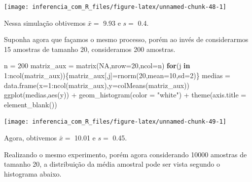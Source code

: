 \documentclass[
]{book}
\newenvironment{Shaded}{\begin{snugshade}}{\end{snugshade}}
\newcommand{\AttributeTok}[1]{\textcolor[rgb]{0.77,0.63,0.00}{#1}}
\newcommand{\ConstantTok}[1]{\textcolor[rgb]{0.00,0.00,0.00}{#1}}
\newcommand{\ControlFlowTok}[1]{\textcolor[rgb]{0.13,0.29,0.53}{\textbf{#1}}}
\newcommand{\DecValTok}[1]{\textcolor[rgb]{0.00,0.00,0.81}{#1}}
\newcommand{\FunctionTok}[1]{\textcolor[rgb]{0.00,0.00,0.00}{#1}}
\newcommand{\NormalTok}[1]{#1}
\newcommand{\OtherTok}[1]{\textcolor[rgb]{0.56,0.35,0.01}{#1}}
\newcommand{\SpecialCharTok}[1]{\textcolor[rgb]{0.00,0.00,0.00}{#1}}
\newcommand{\StringTok}[1]{\textcolor[rgb]{0.31,0.60,0.02}{#1}}
\begin{document}
\begin{center}\texttt{[image: inferencia\_com\_R\_files/figure-latex/unnamed-chunk-48-1]} \end{center}

Nessa simulação obtivemos \(\bar x =\) 9.93 e \(s =\) 0.4.

Suponha agora que façamos o mesmo processo, porém ao invés de considerarmos 15 amostras de tamanho 20, consideramos 200 amostras.

\begin{Shaded}
\begin{Highlighting}[]
\NormalTok{n }\OtherTok{=} \DecValTok{200}
\NormalTok{matriz\_aux }\OtherTok{=} \FunctionTok{matrix}\NormalTok{(}\ConstantTok{NA}\NormalTok{,}\AttributeTok{nrow=}\DecValTok{20}\NormalTok{,}\AttributeTok{ncol=}\NormalTok{n)}
\ControlFlowTok{for}\NormalTok{(j }\ControlFlowTok{in} \DecValTok{1}\SpecialCharTok{:}\FunctionTok{ncol}\NormalTok{(matriz\_aux))\{matriz\_aux[,j]}\OtherTok{=}\FunctionTok{rnorm}\NormalTok{(}\DecValTok{20}\NormalTok{,}\AttributeTok{mean=}\DecValTok{10}\NormalTok{,}\AttributeTok{sd=}\DecValTok{2}\NormalTok{)\}}
\NormalTok{medias }\OtherTok{=} \FunctionTok{data.frame}\NormalTok{(}\AttributeTok{x=}\DecValTok{1}\SpecialCharTok{:}\FunctionTok{ncol}\NormalTok{(matriz\_aux),}\AttributeTok{y=}\FunctionTok{colMeans}\NormalTok{(matriz\_aux))}
\FunctionTok{ggplot}\NormalTok{(medias,}\FunctionTok{aes}\NormalTok{(y)) }\SpecialCharTok{+}
  \FunctionTok{geom\_histogram}\NormalTok{(}\AttributeTok{color =} \StringTok{"white"}\NormalTok{) }\SpecialCharTok{+}
  \FunctionTok{theme}\NormalTok{(}\AttributeTok{axis.title =} \FunctionTok{element\_blank}\NormalTok{())}
\end{Highlighting}
\end{Shaded}

\begin{center}\texttt{[image: inferencia\_com\_R\_files/figure-latex/unnamed-chunk-49-1]} \end{center}

Agora, obtivemos \(\bar x =\) 10.01 e \(s =\) 0.45.

Realizando o mesmo experimento, porém agora considerando 10000 amostras de tamanho 20, a distribuição da média amostral pode ser vista segundo o histograma abaixo.
\end{document}
